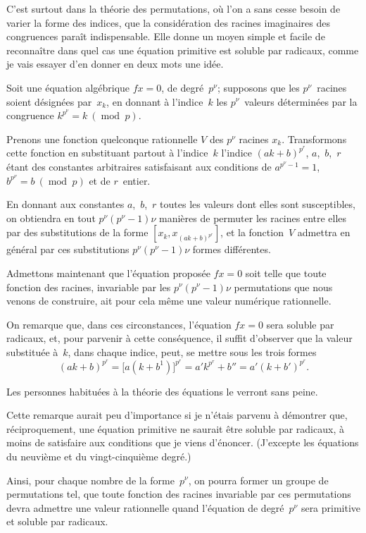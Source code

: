 \documentclass[leqno,12pt]{book}[2005/09/16]
\DeclareMathOperator{\Mod}{mod\;}
\renewcommand{\mod}{\Mod}
\begin{document}
C'est surtout dans la théorie des permutations, où l'on a sans
cesse besoin de varier la forme des indices, que la considération
des racines imaginaires des congruences paraît indispensable.
Elle donne un moyen simple et facile de reconnaître dans quel
cas une équation primitive est soluble par radicaux, comme je
vais essayer d'en donner en deux mots une idée.

Soit une équation algébrique $fx = 0$, de degré~$p^{\nu}$; supposons
que les $p^{\nu}$~racines soient désignées par~$x_{k}$, en donnant à l'indice~$k$
les $p^{\nu}$~valeurs déterminées par la congruence $k^{p^{\nu}}\! =k\ (\mod p)$.

Prenons une fonction quelconque rationnelle $V$ des $p^{\nu}$ racines $x_{k}$.
Transformons cette fonction en substituant partout à l'indice~$k$
l'indice $(ak + b)^{p^{r}}\!$, $a$,~$b$,~$r$ étant des constantes arbitraires satisfaisant
aux conditions de $a^{p^{\nu}-1}\! = 1$, $b^{p^{\nu}}\! = b\ (\mod p)$ et de $r$~entier.

En donnant aux constantes $a$,~$b$,~$r$ toutes les valeurs dont elles
sont susceptibles, on obtiendra en tout $p^{\nu}(p^{\nu} - 1)\nu$ manières de
permuter les racines entre elles par des substitutions de la forme
$[x_{k}, x_{(ak+b)^{p^{r}}}]$, et la fonction~$V$ admettra en général par ces substitutions
$p^{\nu}(p^{\nu} - 1)\nu$ formes différentes.

Admettons maintenant que l'équation proposée $fx = 0$ soit
telle que toute fonction des racines, invariable par les $p^{\nu}(p^{\nu} - 1)\nu$
permutations que nous venons de construire, ait pour cela même
une valeur numérique rationnelle.

On remarque que, dans ces circonstances, l'équation $fx = 0$
sera soluble par radicaux, et, pour parvenir à cette conséquence,
il suffit d'observer que la valeur substituée à~$k$, dans chaque
indice, peut, se mettre sous les trois formes
\[
(ak + b)^{p^{r}}\!
  = \bigl[a(k + b^{1})\bigr]^{p^{r}}\!
  = a' k^{p^{r}} + b''
  = a' (k+b')^{p^{r}}.
\]

Les personnes habituées à la théorie des équations le verront
sans peine.

Cette remarque aurait peu d'importance si je n'étais parvenu à
démontrer que, réciproquement, une équation primitive ne saurait
être soluble par radicaux, à moins de satisfaire aux conditions
que je viens d'énoncer. (J'excepte les équations du neuvième et
du vingt-cinquième degré.)

Ainsi, pour chaque nombre de la forme~$p^{\nu}$, on pourra former
un groupe de permutations tel, que toute fonction des racines
invariable par ces permutations devra admettre une valeur rationnelle
quand l'équation de degré~$p^{\nu}$ sera primitive et soluble par
radicaux.
\end{document}
